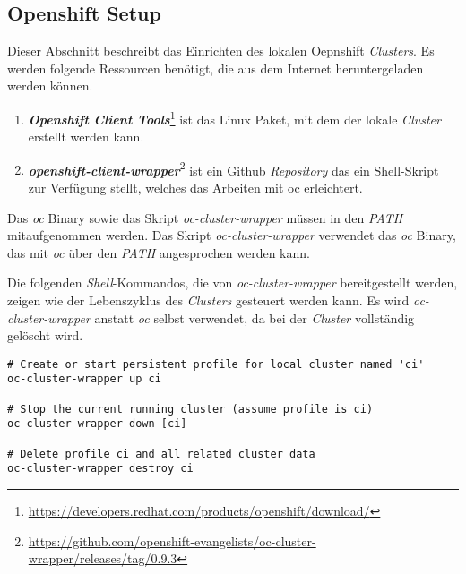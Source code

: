 \subsection{Openshift Setup}
Dieser Abschnitt beschreibt das Einrichten des lokalen Oepnshift \emph{Clusters}. Es werden folgende Ressourcen benötigt, die aus dem Internet heruntergeladen werden können.
\begin{enumerate}
	\item\textbf{\emph{Openshift Client Tools}}\footnote{\url{https://developers.redhat.com/products/openshift/download/}} ist das Linux Paket, mit dem der lokale \emph{Cluster} erstellt werden kann.
	\item\textbf{\emph{openshift-client-wrapper}}\footnote{\url{https://github.com/openshift-evangelists/oc-cluster-wrapper/releases/tag/0.9.3}} ist ein Github \emph{Repository} das ein Shell-Skript zur Verfügung stellt, welches das Arbeiten mit oc erleichtert.
\end{enumerate}
Das \emph{oc} Binary sowie das Skript \emph{oc-cluster-wrapper} müssen in den \emph{PATH} mitaufgenommen werden. Das Skript \emph{oc-cluster-wrapper} verwendet das \emph{oc} Binary, das mit \emph{oc} über den \emph{PATH} angesprochen werden kann.
\newpage

Die folgenden \emph{Shell}-Kommandos, die von \emph{oc-cluster-wrapper} bereitgestellt werden, zeigen wie der Lebenszyklus des \emph{Clusters} gesteuert werden kann. Es wird \emph{oc-cluster-wrapper} anstatt \emph{oc} selbst verwendet, da bei  der \emph{Cluster} vollständig gelöscht wird.
\begin{verbatim}
# Create or start persistent profile for local cluster named 'ci'
oc-cluster-wrapper up ci

# Stop the current running cluster (assume profile is ci)
oc-cluster-wrapper down [ci]

# Delete profile ci and all related cluster data
oc-cluster-wrapper destroy ci
\end{verbatim}

